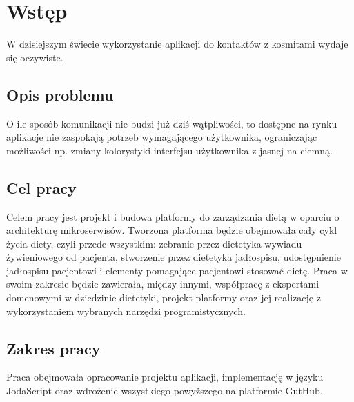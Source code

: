 \chapter*{Wstęp}

W dzisiejszym świecie wykorzystanie aplikacji do kontaktów z kosmitami wydaje się oczywiste. \lipsum[6]

\section*{Opis problemu}

O ile sposób komunikacji nie budzi już dziś wątpliwości, to dostępne na rynku aplikacje nie zaspokają potrzeb wymagającego użytkownika, ograniczając możliwości np. zmiany kolorystyki interfejsu użytkownika z jasnej na ciemną. \lipsum[8]

\section*{Cel pracy}

Celem pracy jest projekt i budowa platformy do zarządzania dietą w oparciu o architekturę mikroserwisów. Tworzona platforma będzie obejmowała cały cykl życia diety, czyli przede wszystkim: zebranie przez dietetyka wywiadu żywieniowego od pacjenta, stworzenie przez dietetyka jadłospisu, udostępnienie jadłospisu pacjentowi i elementy pomagające pacjentowi stosować dietę. Praca w swoim zakresie będzie zawierała, między innymi, współpracę z ekspertami domenowymi w dziedzinie dietetyki, projekt platformy oraz jej realizację z wykorzystaniem wybranych narzędzi programistycznych.

\section*{Zakres pracy}

Praca obejmowała opracowanie projektu aplikacji, implementację w języku JodaScript oraz wdrożenie wszystkiego powyższego na platformie GutHub. \lipsum[13]
\thispagestyle{normal}